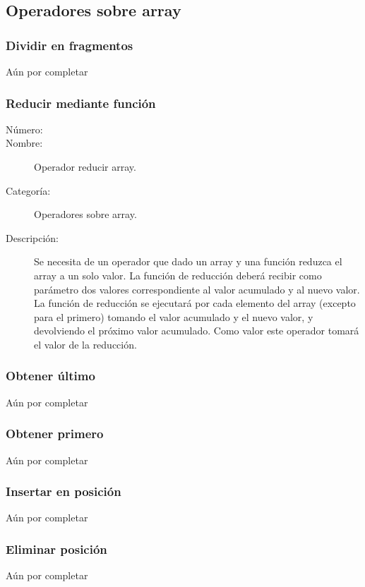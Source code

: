 \subsection{Operadores sobre array}

\subsubsection{Dividir en fragmentos}
Aún por completar

\subsubsection{Reducir mediante función}
\begin{framed}
	\begin{description}
		\item [Número:] \cn
		\item [Nombre:] Operador reducir array.
		\item [Categoría:] Operadores sobre array.
		\item [Descripción:] Se necesita de un operador que dado un array y una función reduzca el array a un solo valor.
      La función de reducción deberá recibir como parámetro dos valores correspondiente al valor acumulado y al nuevo valor. 
      La función de reducción se ejecutará por cada elemento del array (excepto para el primero) tomando el valor acumulado y el nuevo valor, y devolviendo
      el próximo valor acumulado. Como valor este operador tomará el valor de la reducción. 
	\end {description}
\end{framed}


\subsubsection{Obtener último}
Aún por completar

\subsubsection{Obtener primero}
Aún por completar

\subsubsection{Insertar en posición}
Aún por completar

\subsubsection{Eliminar posición}
Aún por completar


